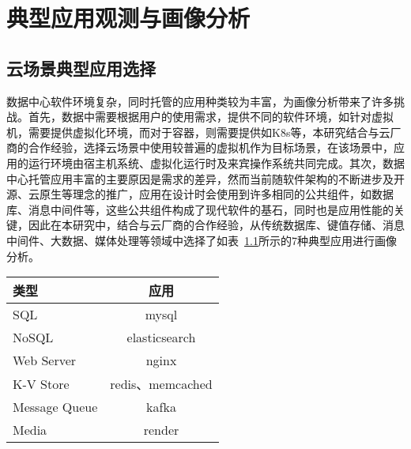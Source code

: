 \chapter{典型应用观测与画像分析}\label{chap:profiling}

\section{云场景典型应用选择}


数据中心软件环境复杂，同时托管的应用种类较为丰富，为画像分析带来了许多挑战。首先，数据中需要根据用户的使用需求，提供不同的软件环境，如针对虚拟机，需要提供虚拟化环境，而对于容器，则需要提供如K8s等，本研究结合与云厂商的合作经验，选择云场景中使用较普遍的虚拟机作为目标场景，在该场景中，应用的运行环境由宿主机系统、虚拟化运行时及来宾操作系统共同完成。其次，数据中心托管应用丰富的主要原因是需求的差异，然而当前随软件架构的不断进步及开源、云原生等理念的推广，应用在设计时会使用到许多相同的公共组件，如数据库、消息中间件等，这些公共组件构成了现代软件的基石，同时也是应用性能的关键，因此在本研究中，结合与云厂商的合作经验，从传统数据库、键值存储、消息中间件、大数据、媒体处理等领域中选择了如表~\ref{tab:typical_application}所示的7种典型应用进行画像分析。

\begin{table}
    \label{tab:typical_application}
    \footnotesize%
    \setlength{\tabcolsep}{4pt}%
    \renewcommand{\arraystretch}{1.5}%
    \centering
    \begin{tabular}{lc}
        \hline
        类型 & 应用\\
        \hline
        SQL & mysql\\
        NoSQL & elasticsearch\\
        Web Server & nginx\\
        K-V Store & redis、memcached\\
        Message Queue & kafka\\
        Media & render\\
        \hline
    \end{tabular}
\end{table}

